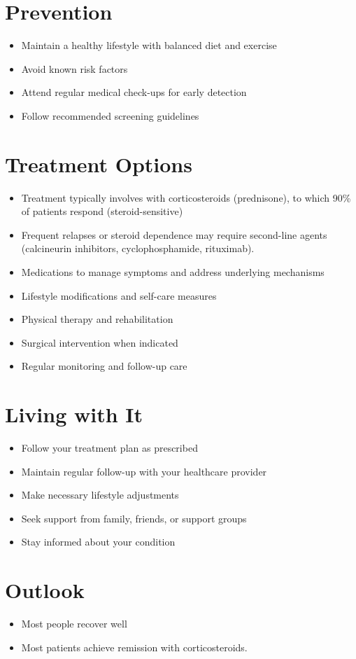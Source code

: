 \section{Prevention}
\begin{itemize}[noitemsep]
  \item Maintain a healthy lifestyle with balanced diet and exercise
  \item Avoid known risk factors
  \item Attend regular medical check-ups for early detection
  \item Follow recommended screening guidelines
\end{itemize}
\section{Treatment Options}
\begin{itemize}[noitemsep]
  \item Treatment typically involves with corticosteroids (prednisone), to which 90\% of patients respond (steroid-sensitive)
  \item Frequent relapses or steroid dependence may require second-line agents (calcineurin inhibitors, cyclophosphamide, rituximab).
  \item Medications to manage symptoms and address underlying mechanisms
  \item Lifestyle modifications and self-care measures
  \item Physical therapy and rehabilitation
  \item Surgical intervention when indicated
  \item Regular monitoring and follow-up care
\end{itemize}
\section{Living with It}
\begin{itemize}[noitemsep]
  \item Follow your treatment plan as prescribed
  \item Maintain regular follow-up with your healthcare provider
  \item Make necessary lifestyle adjustments
  \item Seek support from family, friends, or support groups
  \item Stay informed about your condition
\end{itemize}
\section{Outlook}
\begin{itemize}[noitemsep]
  \item Most people recover well
  \item Most patients achieve remission with corticosteroids.
\end{itemize}
